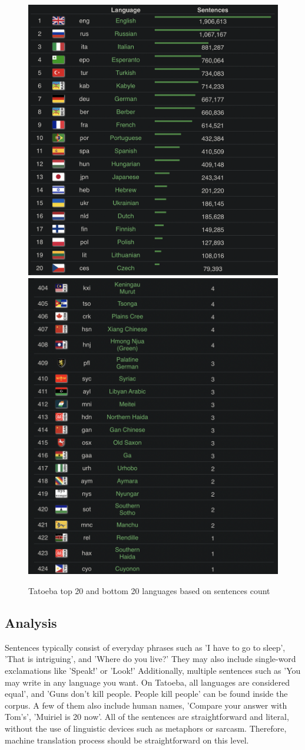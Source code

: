 \documentclass[a4paper]{article}
\begin{document}
\begin{figure}[htbp]
    \centering
    \includegraphics[width=0.5\linewidth]{images/tatoeba_top_20_lang.png}
    \includegraphics[width=0.46\linewidth]{images/tatoeba_bottom_20_lang.png}
    \caption{Tatoeba top 20 and bottom 20 languages based on sentences count \cite{tatoeba}}
    \label{fig:tatoeba_top_bottom_languages}
\end{figure}


\subsection{Analysis}

Sentences typically consist of everyday phrases such as 'I have to go to sleep', 'That is intriguing', and 'Where do you live?' They may also include single-word exclamations like 'Speak!' or 'Look!' Additionally, multiple sentences such as 'You may write in any language you want. On Tatoeba, all languages are considered equal', and 'Guns don't kill people. People kill people' can be found inside the corpus. A few of them also include human names, 'Compare your answer with Tom's', 'Muiriel is 20 now'. All of the sentences are straightforward and literal, without the use of linguistic devices such as metaphors or sarcasm. Therefore, machine translation process should be straightforward on this level.
\end{document}
